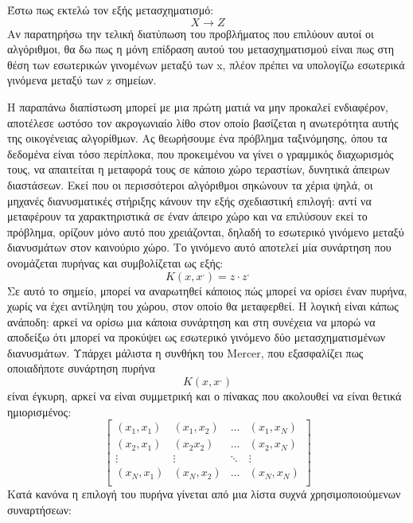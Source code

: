 		Έστω πως εκτελώ τον εξής μετασχηματισμό:
	   \begin{equation}
	   		X \rightarrow Z
	   \end{equation}
		Αν παρατηρήσω την τελική διατύπωση του προβλήματος που επιλύουν αυτοί οι αλγόριθμοι, θα δω πως η μόνη επίδραση αυτού του μετασχηματισμού είναι πως στη θέση των εσωτερικών γινομένων μεταξύ των x, πλέον πρέπει να υπολογίζω εσωτερικά γινόμενα μεταξύ των z σημείων.
		
		Η παραπάνω διαπίστωση μπορεί με μια πρώτη ματιά να μην προκαλεί ενδιαφέρον, αποτέλεσε ωστόσο τον ακρογωνιαίο λίθο στον οποίο βασίζεται η ανωτερότητα αυτής της οικογένειας αλγορίθμων. Ας θεωρήσουμε ένα πρόβλημα ταξινόμησης, όπου τα δεδομένα είναι τόσο περίπλοκα, που προκειμένου να γίνει ο γραμμικός διαχωρισμός τους, να απαιτείται η μεταφορά τους σε κάποιο χώρο τεραστίων, δυνητικά άπειρων διαστάσεων. Εκεί που οι περισσότεροι αλγόριθμοι σηκώνουν τα χέρια ψηλά, οι μηχανές διανυσματικές στήριξης κάνουν την εξής σχεδιαστική επιλογή: αντί να μεταφέρουν τα χαρακτηριστικά σε έναν άπειρο χώρο και να επιλύσουν εκεί το πρόβλημα, ορίζουν μόνο αυτό που χρειάζονται, δηλαδή το εσωτερικό γινόμενο μεταξύ διανυσμάτων στον καινούριο χώρο. Το γινόμενο αυτό αποτελεί μία συνάρτηση που ονομάζεται πυρήνας και συμβολίζεται ως εξής: 
		\begin{equation}
		K(x, x^,)= z \cdot z^,
		\end{equation}
		Σε αυτό το σημείο, μπορεί να αναρωτηθεί κάποιος πώς μπορεί να ορίσει έναν πυρήνα, χωρίς να έχει αντίληψη του χώρου, στον οποίο θα μεταφερθεί. Η λογική είναι κάπως ανάποδη: αρκεί να ορίσω μια κάποια συνάρτηση και στη συνέχεια να μπορώ να αποδείξω ότι μπορεί να προκύψει ως εσωτερικό γινόμενο δύο μετασχηματισμένων διανυσμάτων. Υπάρχει μάλιστα η συνθήκη του Mercer, που εξασφαλίζει πως οποιαδήποτε συνάρτηση πυρήνα
		\begin{equation}
		K(x, x^,)
		\end{equation}
		είναι έγκυρη, αρκεί να είναι συμμετρική και ο πίνακας που ακολουθεί να είναι θετικά ημιορισμένος:
		\[
		\begin{bmatrix}
		(x_1, x_1) &  (x_1, x_2)  & \dots  &   (x_1, x_N) \\
		(x_2, x_1) &  (x_2 x_2)  & \dots  &   (x_2, x_N) \\
		\vdots  & \vdots &\ddots & \vdots \\
		(x_N, x_1) &  (x_N, x_2)  & \dots  &   (x_N, x_N) \\
		\end{bmatrix}
		\]
		Κατά κανόνα η επιλογή του πυρήνα γίνεται από μια λίστα συχνά χρησιμοποιούμενων συναρτήσεων:
